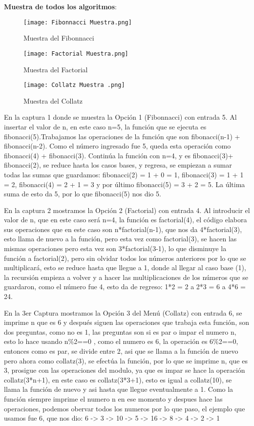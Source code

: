 \documentclass[letterpaper,12pt,oneside]{article}
\begin{document}
\begin{center}
    \textbf{Muestra de todos los algoritmos}:
\end{center}
\begin{figure}[htbp!]
    \centering
    \texttt{[image: Fibonnacci Muestra.png]}
    \caption{Muestra del Fibonnacci}
\end{figure}
\begin{figure}[htbp!]
    \centering
    \texttt{[image: Factorial Muestra.png]}
    \caption{Muestra del Factorial}
\end{figure}
\begin{figure}[htbp!]
    \centering
    \texttt{[image: Collatz Muestra .png]}
    \caption{Muestra del Collatz}
\end{figure}
En la captura 1 donde se muestra la Opción 1 (Fibonnacci) con entrada 5. Al insertar el valor de n, en este caso n=5, la función que se ejecuta es fibonacci(5).Trabajamos las operaciones de la función que son fibonacci(n-1) + fibonacci(n-2). Como el número ingresado fue 5, queda esta operación como fibonacci(4) + fibonacci(3). Continúa la función con n=4, y es fibonacci(3)+ fibonacci(2), se reduce hasta los casos bases, y regresa, se empiezan a sumar todas las sumas que guardamos: fibonacci(2) = 1 + 0 = 1, fibonacci(3) = 1 + 1 = 2, fibonacci(4) = 2 + 1 = 3  y  por último fibonacci(5) = 3 + 2 = 5. La última suma de esto da 5, por lo que fibonacci(5) nos dio 5.

En la captura 2 mostramos la Opción 2 (Factorial) con entrada 4. Al introducir el valor de n, que en este caso será n=4, la función es factorial(4), el código elabora sus operaciones que en este caso son n*factorial(n-1), que nos da 4*factorial(3), esto llama de nuevo a la función, pero esta vez como factorial(3), se hacen las mismas operaciones pero esta vez son 3*factorial(3-1), lo que disminuye la función a factorial(2), pero sin olvidar todos los números anteriores por lo que se multiplicará, esto se reduce hasta que llegue a 1, donde al llegar al caso base (1), la recursión empieza a volver y a hacer las multiplicaciones de los números que se guardaron, como el número fue 4, esto da de regreso: 1*2 = 2   a   2*3 = 6   a    4*6 = 24.

En la 3er Captura mostramos la Opción 3 del Menú (Collatz) con entrada 6, se imprime n que es 6 y después siguen las operaciones que trabaja esta función, son dos preguntas, como no es 1, las preguntas son si es par o impar el numero n, esto lo hace usando n\%2==0 , como el numero es 6, la operación es 6\%2==0, entonces como es par, se divide entre 2, asi que se llama a la función de nuevo pero ahora como collatz(3), se efectúa la función, por lo que se imprime n, que es 3, prosigue con las operaciones del modulo, ya que es impar se hace la operación collatz(3*n+1), en este caso es collatz(3*3+1), esto es igual a collatz(10), se llama la función de nuevo y asi hasta que llegue eventualmente a 1. Como la función siempre imprime el numero n en ese momento y despues hace las operaciones, podemos obervar todos los numeros por lo que paso, el ejemplo que usamos fue 6, que nos dio:  6 -> 3 -> 10 -> 5 -> 16 -> 8 -> 4 -> 2 -> 1
\end{document}
